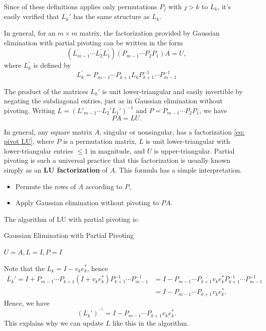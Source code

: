 Since of these definitions applies only permutations $P_j$ with $j>k$ to $L_k$, it's easily verified that $L_k'$ has the same structure as $L_k$.


In general, for an $m \times m$ matrix, the factorization provided by Gaussian elimination with partial pivoting can be written in the form
$$
\left(L_{m-1}^{\prime} \cdots L_2^{\prime} L_1^{\prime}\right)\left(P_{m-1} \cdots P_2 P_1\right) A=U,
$$
where $L_k^{\prime}$ is defined by
$$
L_k^{\prime}=P_{m-1} \cdots P_{k+1} L_k P_{k+1}^{-1} \cdots P_{m-1}^{-1}
$$

The product of the matrices $L_k'$ is unit lower-triangular and easily invertible by negating the subdiagonal entries, just as in Gaussian elimination without pivoting. Writing $ L= (L'_{m-1}\cdots L_2' L_1')^{-1}  $  and $P=P_{m-1}\cdots P_2 P_1$, we have 
\begin{equation}
\label{eq: pivot LU}
    PA = LU. 
\end{equation}

In general, any square matrix $A$, singular or nonsingular, has a factorization \eqref{eq: pivot LU}, where $P$ is a permutation matrix, $L$ is unit lower-triangular with lower-triangular entries $\leq 1$ in magnitude, and $U$ is upper-triangular. Partial pivoting is such a universal practice that this factorization is usually known simply as an \textbf{LU factorization} of $A$. This formula has a simple interpretation. 
\begin{itemize}
    \item Permute the rows of $A$ according to $P$,
    \item Apply Gaussian elimination without pivoting to $PA$. 
\end{itemize}

The algorithm of LU with partial pivoting is: 

\begin{algorithm}[H]
    \caption{Gaussian Elimination with Partial Pivoting}
    \label{Algo 21.1}
    $ U=A, L=I, P=I $\; 
\end{algorithm}

Note that the $L_k = I - v_k e_k^*$, hence 
\begin{align*}
    L_k' = I + P_{m-1} \cdots P_{k+1} (I+ v_k e_k^*) P_{k+1}^{-1} \cdots P_{m-1}^{-1} &= I - P_{m-1} \cdots P_{k+1} v_k e_k^* P_{k+1}^{-1} \cdots P_{m-1}^{-1}\\ 
    &= I-P_{m-1} \cdots P_{k+1} v_k e_k^*.     
\end{align*}
Hence, we have 
\[
    (L_k')^{^{-1} } = I - P_{m-1} \cdots P_{k+1} v_k e_k^*. 
\]
This explains why we can update $L$ like this in the algorithm. 

